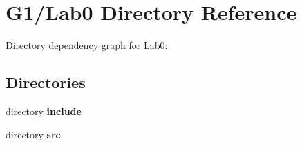 \section{G1/\+Lab0 Directory Reference}
\label{dir_9388d1e7907d108ce18763cd06d60c93}
Directory dependency graph for Lab0\+:
\subsection*{Directories}
\begin{DoxyCompactItemize}
\item 
directory {\bf include}
\item 
directory {\bf src}
\end{DoxyCompactItemize}
